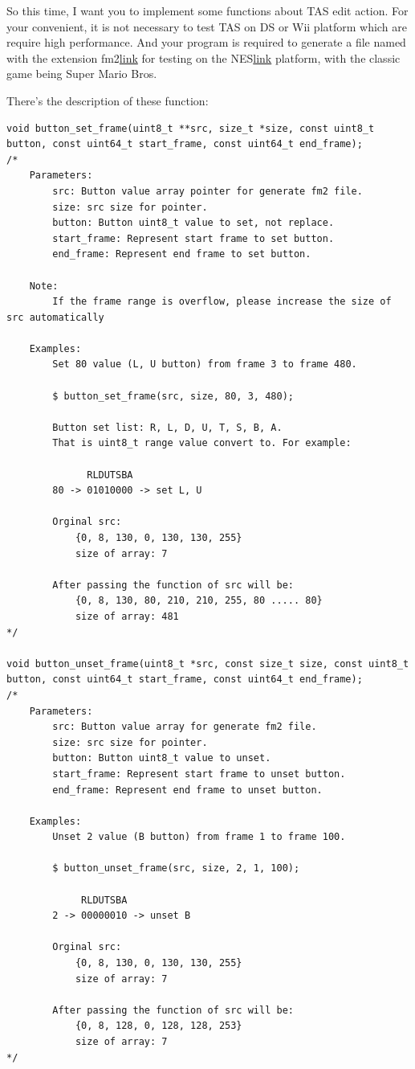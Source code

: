\documentclass[a4paper,11pt]{article}
\begin{document}
So this time, I want you to implement some functions about TAS edit action. For your convenient, it is not necessary to test TAS on DS or Wii platform which are require high performance. And your program is required to generate a file named with the extension fm2{\href{https://fceux.com/web/FM2.html}{\tiny link}} for testing on the NES{\href{https://en.wikipedia.org/wiki/Nintendo_Entertainment_System}{\tiny link}} platform, with the classic game being Super Mario Bros. 

There's the description of these function:
\begin{lstlisting}
void button_set_frame(uint8_t **src, size_t *size, const uint8_t button, const uint64_t start_frame, const uint64_t end_frame);
/*
    Parameters: 
        src: Button value array pointer for generate fm2 file.
        size: src size for pointer.
        button: Button uint8_t value to set, not replace.
        start_frame: Represent start frame to set button.
        end_frame: Represent end frame to set button.

    Note:
        If the frame range is overflow, please increase the size of src automatically

    Examples:
        Set 80 value (L, U button) from frame 3 to frame 480.
        
        $ button_set_frame(src, size, 80, 3, 480);
        
        Button set list: R, L, D, U, T, S, B, A. 
        That is uint8_t range value convert to. For example:
               
              RLDUTSBA 
        80 -> 01010000 -> set L, U

        Orginal src:
            {0, 8, 130, 0, 130, 130, 255}
            size of array: 7
            
        After passing the function of src will be:
            {0, 8, 130, 80, 210, 210, 255, 80 ..... 80}
            size of array: 481
*/

void button_unset_frame(uint8_t *src, const size_t size, const uint8_t button, const uint64_t start_frame, const uint64_t end_frame);
/*
    Parameters: 
        src: Button value array for generate fm2 file.
        size: src size for pointer.
        button: Button uint8_t value to unset.
        start_frame: Represent start frame to unset button.
        end_frame: Represent end frame to unset button.

    Examples:
        Unset 2 value (B button) from frame 1 to frame 100.
        
        $ button_unset_frame(src, size, 2, 1, 100);
               
             RLDUTSBA 
        2 -> 00000010 -> unset B

        Orginal src:
            {0, 8, 130, 0, 130, 130, 255}
            size of array: 7
            
        After passing the function of src will be: 
            {0, 8, 128, 0, 128, 128, 253}
            size of array: 7
*/
\end{lstlisting}
\end{document}
